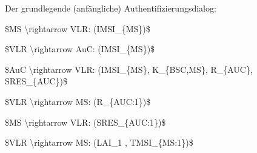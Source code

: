 \documentclass[a4paper]{article}
\begin{document}
\begin{multicols}{3}
      Der grundlegende (anfängliche) Authentifizierungsdialog:
      \begin{enumerate*}
            \def\labelenumi{\arabic{enumi}.}
            \item \$MS \textbackslash rightarrow VLR: (IMSI\_\{MS\})\$
            \item \$VLR \textbackslash rightarrow AuC: (IMSI\_\{MS\})\$
            \item \$AuC \textbackslash rightarrow VLR: (IMSI\_\{MS\}, K\_\{BSC,MS\},
            R\_\{AUC\}, SRES\_\{AUC\})\$
            \item \$VLR \textbackslash rightarrow MS: (R\_\{AUC:1\})\$
            \item \$MS \textbackslash rightarrow VLR: (SRES\_\{AUC:1\})\$
            \item \$VLR \textbackslash rightarrow MS: (LAI\_1 , TMSI\_\{MS:1\})\$
      \end{enumerate*}


\end{multicols}
\end{document}
